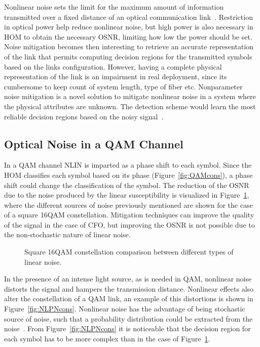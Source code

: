 Nonlinear noise sets the limit for the maximum amount of information transmitted over a fixed distance of an optical communication link~\cite{PrincBorn}. Restriction in optical power help reduce nonlinear noise, but high power is also necessary in HOM to obtain the necessary OSNR, limiting how low the power should be set. Noise mitigation becomes then interesting to retrieve an accurate representation of the link that permits computing decision regions for the transmitted symbols based on the links configuration. However, having a complete physical representation of the link is an impairment in real deployment, since its cumbersome to keep count of system length, type of fiber etc. Nonparameter noise mitigation is a novel solution to mitigate nonlinear noise in a system where the physical attributes are unknown. The detection scheme would learn the most reliable decision regions based on the noisy signal~\cite{NLPNmPSK}.  
          

 
 
 \subsection{Optical Noise in a QAM Channel}

In a QAM channel NLIN is imparted as a phase shift to each symbol. Since the HOM classifies each symbol based on its phase (Figure~\ref{fig:QAMcons}), a phase shift could change the classification of the symbol.
The reduction of the OSNR due to the noise produced by the linear susceptibility is visualized in Figure~\ref{fig:LinerNoise}, where the different sources of noise previously mentioned are shown for the case of a square 16QAM constellation. Mitigation techniques can improve the quality of the signal in the case of CFO, but improving the OSNR is not possible due to the non-stochastic nature of linear noise. 


  \begin{figure}[h!]
 \centering
 \caption{Square 16QAM constellation comparison between different types of linear noise. }
 \label{fig:LinerNoise}
\end{figure}
 In the presence of an intense light source, as is needed in QAM, nonlinear noise distorts the signal and hampers the transmission distance. Nonlinear effects also alter the constellation of a QAM link, an example of this distortions is shown in Figure~\ref{fig:NLPNcons}.  Nonlinear noise has the advantage of being stochastic source of noise, such that a probability distribution could be extracted from the noise~\cite{Zibar:12}. From Figure~\ref{fig:NLPNcons} it is noticeable that the decision region for each symbol has to be more complex than in the case of Figure~\ref{fig:LinerNoise}. 


